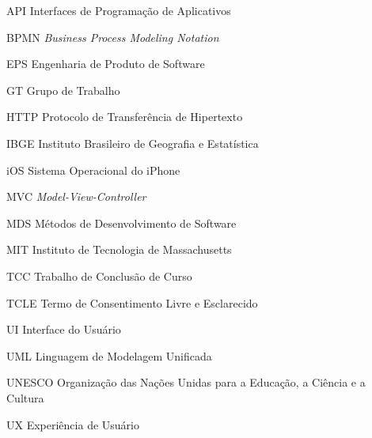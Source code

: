\begin{siglas}
  \item[API] Interfaces de Programação de Aplicativos
  \item[BPMN] \textit{Business Process Modeling Notation}
  \item[EPS] Engenharia de Produto de Software
  \item[GT] Grupo de Trabalho
  \item[HTTP] Protocolo de Transferência de Hipertexto 
  \item[IBGE] Instituto Brasileiro de Geografia e Estatística
  \item[iOS] Sistema Operacional do iPhone 
  \item[MVC] \textit{Model-View-Controller}
  \item[MDS] Métodos de Desenvolvimento de Software
  \item[MIT] Instituto de Tecnologia de Massachusetts
  \item[TCC] Trabalho de Conclusão de Curso 
  \item[TCLE] Termo de Consentimento Livre e Esclarecido 
  \item[UI] Interface do Usuário
  \item[UML] Linguagem de Modelagem Unificada
  \item[UNESCO] Organização das Nações Unidas para a Educação, a Ciência e a Cultura
  \item[UX] Experiência de Usuário
\end{siglas}
